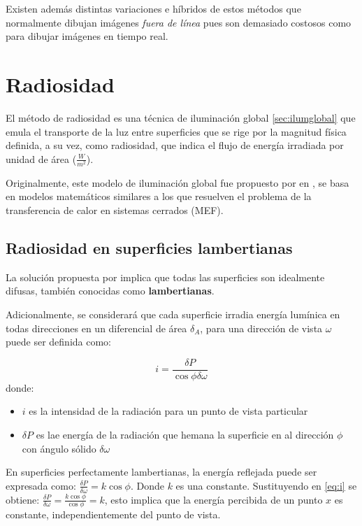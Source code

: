 Existen además distintas variaciones e híbridos de estos métodos que normalmente dibujan imágenes \textit{fuera de línea} pues son demasiado costosos como para dibujar imágenes en tiempo real.

\section{Radiosidad}
\label{sec:radiosidad}

El método de radiosidad es una técnica de iluminación global \ref{sec:ilumglobal} que emula el transporte de la luz entre superficies que se rige por la magnitud física definida, a su vez, como radiosidad, que indica el flujo de energía irradiada por unidad de área ($\frac{W}{m^{2}}$).

Originalmente, este modelo de iluminación global fue propuesto por \citeauthor{Goral} en \citeyear{Goral}, se basa en modelos matemáticos similares a los que resuelven el problema de la transferencia de calor en sistemas cerrados (MEF).

\subsection{Radiosidad en superficies lambertianas}

La solución propuesta por \citeauthor{Goral} implica que todas las superficies son idealmente difusas, también conocidas como \textbf{lambertianas}.

Adicionalmente, se considerará que cada superficie irradia energía lumínica en todas direcciones en un diferencial de área $\delta_{A}$, para una dirección de vista $\omega$ puede ser definida como:

\begin{equation}
    i = \frac{\delta{P}}{\cos{\phi\delta\omega}} \label{eq:i}
\end{equation}
donde:
\begin{itemize}
    \item $i$ es la intensidad de la radiación para un punto de vista particular
    \item $\delta{P}$ es lae energía de la radiación que hemana la superficie en al dirección $\phi$ con ángulo sólido $\delta\omega$
\end{itemize}

En superficies perfectamente lambertianas, la energía reflejada puede ser expresada como: $\frac{\delta{P}}{\delta{\omega}} = k\cos{\phi}$. Donde $k$ es una constante.
Sustituyendo en \eqref{eq:i} se obtiene: $\frac{\delta{P}}{\delta{\omega}} = \frac{k\cos{\phi}}{\cos{\phi}} = k$, esto implica que la energía percibida de un punto $x$ 
es constante, independientemente del punto de vista.

